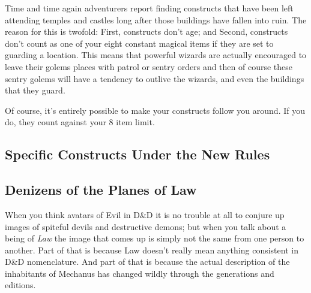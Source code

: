 Time and time again adventurers report finding constructs that have been left attending temples and castles long after those buildings have fallen into ruin. The reason for this is twofold: First, constructs don't age; and Second, constructs don't count as one of your eight constant magical items if they are set to guarding a location. This means that powerful wizards are actually encouraged to leave their golems places with patrol or sentry orders and then of course these sentry golems will have a tendency to outlive the wizards, and even the buildings that they guard.

Of course, it's entirely possible to make your constructs follow you around. If you do, they count against your 8 item limit.


\subsection{Specific Constructs Under the New Rules}



\subsection{Denizens of the Planes of Law}

When you think avatars of Evil in D\&D it is no trouble at all to conjure up images of spiteful devils and destructive demons; but when you talk about a being of \textit{Law} the image that comes up is simply not the same from one person to another. Part of that is because Law doesn't really mean anything consistent in D\&D nomenclature. And part of that is because the actual description of the inhabitants of Mechanus has changed wildly through the generations and editions.

